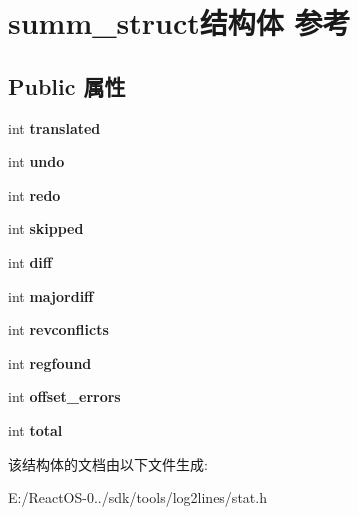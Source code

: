 \hypertarget{structsumm__struct}{}\section{summ\+\_\+struct结构体 参考}
\label{structsumm__struct}
\subsection*{Public 属性}
\begin{DoxyCompactItemize}
\item 
\mbox{\label{structsumm__struct_a193dbdbdfb4bc228b985396db046d9a6}} 
int {\bfseries translated}
\item 
\mbox{\label{structsumm__struct_a27ae9e94d4b62e537ab786c93e9e8f0c}} 
int {\bfseries undo}
\item 
\mbox{\label{structsumm__struct_ac02401c026050f1c55a2e957eefa18a0}} 
int {\bfseries redo}
\item 
\mbox{\label{structsumm__struct_a380a7b8de80ea2482bdc8e9edda40665}} 
int {\bfseries skipped}
\item 
\mbox{\label{structsumm__struct_a978a767bf5e155358c4690778ad95e88}} 
int {\bfseries diff}
\item 
\mbox{\label{structsumm__struct_a7e109fd16c43ff06aea911460fb28735}} 
int {\bfseries majordiff}
\item 
\mbox{\label{structsumm__struct_a8d6eb9e09d71504bea9d3b2c567c596a}} 
int {\bfseries revconflicts}
\item 
\mbox{\label{structsumm__struct_a38956ccb66291e924c31dc3271488de5}} 
int {\bfseries regfound}
\item 
\mbox{\label{structsumm__struct_a0fb1aa4d13bd93752e07fb3fa9c23f3b}} 
int {\bfseries offset\+\_\+errors}
\item 
\mbox{\label{structsumm__struct_a583d7fb69ca7563c6c9c486dc5123631}} 
int {\bfseries total}
\end{DoxyCompactItemize}


该结构体的文档由以下文件生成\+:\begin{DoxyCompactItemize}
\item 
E\+:/\+React\+O\+S-\/0../sdk/tools/log2lines/stat.\+h\end{DoxyCompactItemize}
